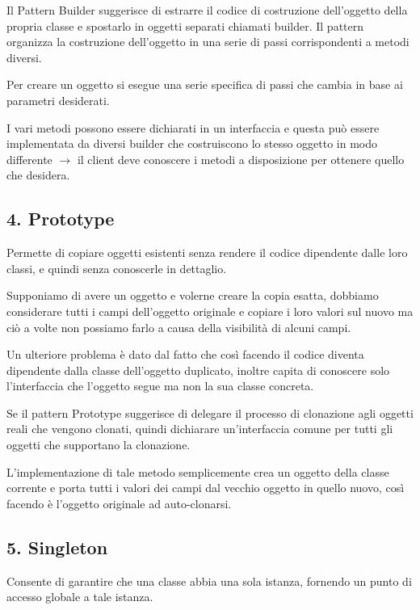 \documentclass{report}
\begin{document}
\noindent
Il Pattern Builder suggerisce di estrarre il codice di costruzione dell'oggetto della propria classe e spostarlo in oggetti separati chiamati builder. Il pattern organizza la costruzione dell'oggetto in una serie di passi corrispondenti a metodi diversi.

\noindent
Per creare un oggetto si esegue una serie specifica di passi che cambia in base ai parametri desiderati.

\medskip
\noindent
I vari metodi possono essere dichiarati in un interfaccia e questa può essere implementata da diversi builder che costruiscono lo stesso oggetto in modo differente $\rightarrow$ il client deve conoscere i metodi a disposizione per ottenere quello che desidera.

\subsection*{4. Prototype}
Permette di copiare oggetti esistenti senza rendere il codice dipendente dalle loro classi, e quindi senza conoscerle in dettaglio.

\noindent
Supponiamo di avere un oggetto e volerne creare la copia esatta, dobbiamo considerare tutti i campi dell'oggetto originale e copiare i loro valori sul nuovo ma ciò a volte non possiamo farlo a causa della visibilità di alcuni campi.

\noindent
Un ulteriore problema è dato dal fatto che così facendo il codice diventa dipendente dalla classe dell'oggetto duplicato, inoltre capita di conoscere solo l'interfaccia che l'oggetto segue ma non la sua classe concreta.

\medskip
\noindent
Se il pattern Prototype suggerisce di delegare il processo di clonazione agli oggetti reali che vengono clonati, quindi dichiarare un'interfaccia comune per tutti gli oggetti che supportano la clonazione.

\noindent
L'implementazione di tale metodo semplicemente crea un oggetto della classe corrente e porta tutti i valori dei campi dal vecchio oggetto in quello nuovo, così facendo è l'oggetto originale ad auto-clonarsi.

\newpage
\subsection*{5. Singleton}
Consente di garantire che una classe abbia una sola istanza, fornendo un punto di accesso globale a tale istanza.
\end{document}
